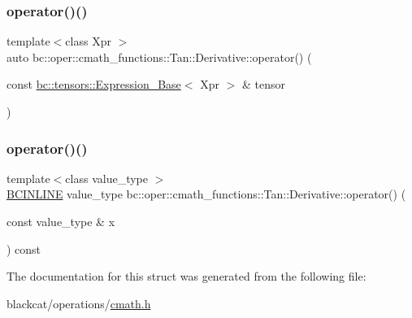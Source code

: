 \mbox{\label{structbc_1_1oper_1_1cmath__functions_1_1Tan_1_1Derivative_a478c88100e74977f873306bbe1271908}} 
\subsubsection{\texorpdfstring{operator()()}{operator()()}\hspace{0.1cm}{\footnotesize\ttfamily [2/3]}}
{\footnotesize\ttfamily template$<$class Xpr $>$ \\
auto bc\+::oper\+::cmath\+\_\+functions\+::\+Tan\+::\+Derivative\+::operator() (\begin{DoxyParamCaption}\item[{const \hyperlink{classbc_1_1tensors_1_1Expression__Base}{bc\+::tensors\+::\+Expression\+\_\+\+Base}$<$ Xpr $>$ \&}]{tensor }\end{DoxyParamCaption})\hspace{0.3cm}{\ttfamily [inline]}}

\mbox{\label{structbc_1_1oper_1_1cmath__functions_1_1Tan_1_1Derivative_a8e76b3dfad2198162015ef6fce1f45ba}} 
\subsubsection{\texorpdfstring{operator()()}{operator()()}\hspace{0.1cm}{\footnotesize\ttfamily [3/3]}}
{\footnotesize\ttfamily template$<$class value\+\_\+type $>$ \\
\hyperlink{common_8h_a6699e8b0449da5c0fafb878e59c1d4b1}{B\+C\+I\+N\+L\+I\+NE} value\+\_\+type bc\+::oper\+::cmath\+\_\+functions\+::\+Tan\+::\+Derivative\+::operator() (\begin{DoxyParamCaption}\item[{const value\+\_\+type \&}]{x }\end{DoxyParamCaption}) const\hspace{0.3cm}{\ttfamily [inline]}}



The documentation for this struct was generated from the following file\+:\begin{DoxyCompactItemize}
\item 
blackcat/operations/\hyperlink{cmath_8h}{cmath.\+h}\end{DoxyCompactItemize}
